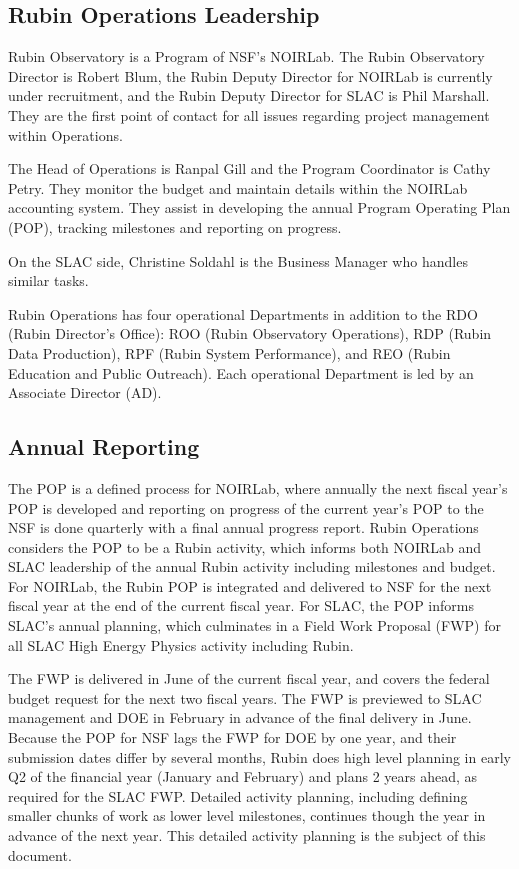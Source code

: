 \subsection{Rubin Operations Leadership}
\label{sec:contacts}

Rubin Observatory is a Program of NSF's NOIRLab.
The Rubin Observatory \gls{Director} is Robert Blum, the Rubin Deputy \gls{Director} for NOIRLab is currently under recruitment, and the Rubin Deputy \gls{Director} for SLAC is Phil Marshall.
They are the first point of contact for all issues regarding project management within \RO Operations.

The Head of Operations is Ranpal Gill and the Program Coordinator is Cathy Petry.
They monitor the budget and maintain details within the NOIRLab accounting system.
They assist in developing the annual Program Operating Plan (POP), tracking milestones and reporting on progress.

On the SLAC side, Christine Soldahl is the Business Manager who handles similar tasks.

Rubin Operations has four operational Departments in addition to the RDO (Rubin Director’s Office): ROO (Rubin Observatory Operations), RDP (Rubin Data Production), RPF (Rubin System Performance), and REO (Rubin Education and Public Outreach).
Each operational Department is led by an Associate Director (AD).

\subsection{Annual Reporting}
\label{sec:reporting}

The POP is a defined process for NOIRLab, where annually the next fiscal year's POP is developed and reporting on progress of the current year's POP to the NSF is done quarterly with a final annual progress report.
Rubin Operations considers the POP to be a Rubin activity, which informs both NOIRLab and SLAC leadership of the annual Rubin activity including milestones and budget.
For NOIRLab, the Rubin POP is integrated and delivered to NSF for the next fiscal year at the end of the current fiscal year.
For SLAC, the POP informs SLAC's annual planning, which culminates in a Field Work Proposal (FWP) for all SLAC High Energy Physics activity including Rubin.

The FWP is delivered in June of the current fiscal year, and covers the federal budget request for the next two fiscal years.
The FWP is previewed to SLAC management and DOE in February in advance of the final delivery in June.
Because the POP for NSF lags the FWP for DOE by one year, and their submission dates differ by several months, Rubin does high level planning in early Q2 of the financial year (January and February) and plans 2 years ahead, as required for the SLAC FWP.
Detailed activity planning, including defining smaller chunks of work as lower level milestones, continues though the year in advance of the next year.
This detailed activity planning is the subject of this document.

